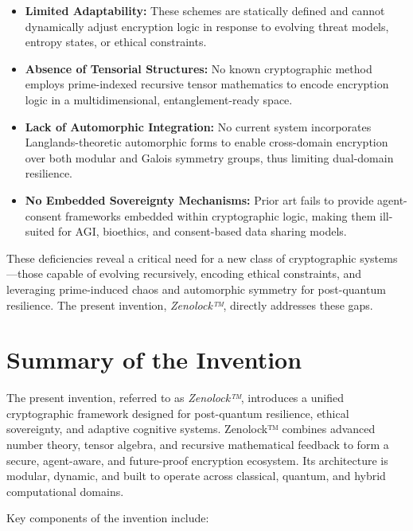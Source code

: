 \documentclass{article}
\theoremstyle{plain}
\begin{document}
\begin{itemize}
  \item \textbf{Limited Adaptability:} These schemes are statically defined and cannot dynamically adjust encryption logic in response to evolving threat models, entropy states, or ethical constraints.
  
  \item \textbf{Absence of Tensorial Structures:} No known cryptographic method employs prime-indexed recursive tensor mathematics to encode encryption logic in a multidimensional, entanglement-ready space.
  
  \item \textbf{Lack of Automorphic Integration:} No current system incorporates Langlands-theoretic automorphic forms to enable cross-domain encryption over both modular and Galois symmetry groups, thus limiting dual-domain resilience.
  
  \item \textbf{No Embedded Sovereignty Mechanisms:} Prior art fails to provide agent-consent frameworks embedded within cryptographic logic, making them ill-suited for AGI, bioethics, and consent-based data sharing models.
\end{itemize}

These deficiencies reveal a critical need for a new class of cryptographic systems—those capable of evolving recursively, encoding ethical constraints, and leveraging prime-induced chaos and automorphic symmetry for post-quantum resilience. The present invention, \textit{Zenolock™}, directly addresses these gaps.


\section{Summary of the Invention}

The present invention, referred to as \textit{Zenolock™}, introduces a unified cryptographic framework designed for post-quantum resilience, ethical sovereignty, and adaptive cognitive systems. Zenolock™ combines advanced number theory, tensor algebra, and recursive mathematical feedback to form a secure, agent-aware, and future-proof encryption ecosystem. Its architecture is modular, dynamic, and built to operate across classical, quantum, and hybrid computational domains.

Key components of the invention include:
\end{document}
